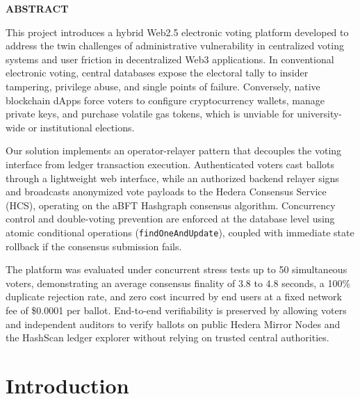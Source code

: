 \documentclass[12pt, a4paper]{article}
\begin{document}

\newpage
\begin{center}
    \Large \textbf{ABSTRACT}
\end{center}
\vspace{0.5cm}
This project introduces a hybrid Web2.5 electronic voting platform developed to address the twin challenges of administrative vulnerability in centralized voting systems and user friction in decentralized Web3 applications. In conventional electronic voting, central databases expose the electoral tally to insider tampering, privilege abuse, and single points of failure. Conversely, native blockchain dApps force voters to configure cryptocurrency wallets, manage private keys, and purchase volatile gas tokens, which is unviable for university-wide or institutional elections.

Our solution implements an operator-relayer pattern that decouples the voting interface from ledger transaction execution. Authenticated voters cast ballots through a lightweight web interface, while an authorized backend relayer signs and broadcasts anonymized vote payloads to the Hedera Consensus Service (HCS), operating on the aBFT Hashgraph consensus algorithm. Concurrency control and double-voting prevention are enforced at the database level using atomic conditional operations (\texttt{findOneAndUpdate}), coupled with immediate state rollback if the consensus submission fails.

The platform was evaluated under concurrent stress tests up to 50 simultaneous voters, demonstrating an average consensus finality of 3.8 to 4.8 seconds, a 100\% duplicate rejection rate, and zero cost incurred by end users at a fixed network fee of \$0.0001 per ballot. End-to-end verifiability is preserved by allowing voters and independent auditors to verify ballots on public Hedera Mirror Nodes and the HashScan ledger explorer without relying on trusted central authorities.

\newpage
\tableofcontents
\newpage


\section{Introduction}
\end{document}
